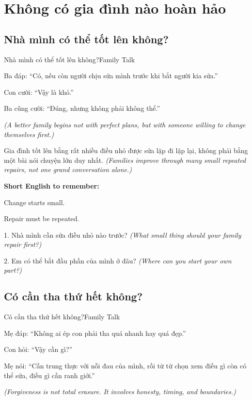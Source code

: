 \chapter{Không có gia đình nào hoàn hảo}

\section{Nhà mình có thể tốt lên không?}
\begin{truyen}{Nhà mình có thể tốt lên không?}{Family Talk}

Ba đáp: ``Có, nếu còn người chịu sửa mình trước khi bắt người kia sửa.''

Con cười: ``Vậy là khó.''

Ba cũng cười: ``Đúng, nhưng không phải không thể.''

\textit{(A better family begins not with perfect plans, but with someone willing to change themselves first.)}
\end{truyen}

\begin{baihoc}
Gia đình tốt lên bằng rất nhiều điều nhỏ được sửa lặp đi lặp lại, không phải bằng một bài nói chuyện lớn duy nhất.
\textit{(Families improve through many small repeated repairs, not one grand conversation alone.)}
\end{baihoc}

\begin{ghinhoanh}
\textbf{Short English to remember:}

Change starts small.

Repair must be repeated.
\end{ghinhoanh}

\begin{tuhocnhanh}
1. Nhà mình cần sửa điều nhỏ nào trước? \textit{(What small thing should your family repair first?)}

2. Em có thể bắt đầu phần của mình ở đâu? \textit{(Where can you start your own part?)}
\end{tuhocnhanh}
\ngancach

\section{Có cần tha thứ hết không?}
\begin{truyen}{Có cần tha thứ hết không?}{Family Talk}

Mẹ đáp: ``Không ai ép con phải tha quá nhanh hay quá đẹp.''

Con hỏi: ``Vậy cần gì?''

Mẹ nói: ``Cần trung thực với nỗi đau của mình, rồi từ từ chọn xem điều gì còn có thể sửa, điều gì cần ranh giới.''

\textit{(Forgiveness is not total erasure. It involves honesty, timing, and boundaries.)}
\end{truyen}

